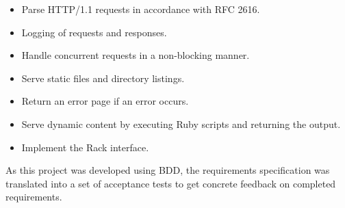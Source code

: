 \begin{itemize}
  \item Parse HTTP/1.1 requests in accordance with RFC 2616.
  \item Logging of requests and responses.
  \item Handle concurrent requests in a non-blocking manner.
  \item Serve static files and directory listings.
  \item Return an error page if an error occurs.
  \item Serve dynamic content by executing Ruby scripts and returning the
  output.
  \item Implement the Rack interface.
\end{itemize}

As this project was developed using BDD, the requirements specification was
translated into a set of acceptance tests to get concrete feedback on
completed requirements.
